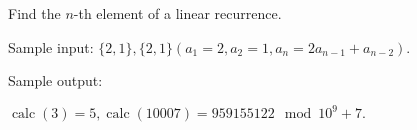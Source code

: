 Find the $n$-th element of a linear recurrence.

Sample input: $\{2,1\},\{2,1\}(a_1=2,a_2=1,a_n=2a_{n-1}+a_{n-2})$.

Sample output:

$\operatorname{calc}(3)=5,\operatorname{calc}(10007)=959155122\mod 10^9+7.$

\inputminted{cpp}{src/mathematics/recurrence-relation/linear-recurrence.cpp.com}

